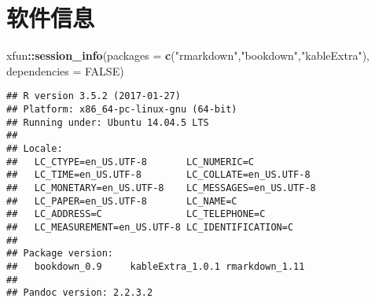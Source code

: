 \documentclass[]{book}
\newenvironment{Shaded}{\begin{snugshade}}{\end{snugshade}}
\newcommand{\DataTypeTok}[1]{\textcolor[rgb]{0.13,0.29,0.53}{#1}}
\newcommand{\KeywordTok}[1]{\textcolor[rgb]{0.13,0.29,0.53}{\textbf{#1}}}
\newcommand{\NormalTok}[1]{#1}
\newcommand{\OperatorTok}[1]{\textcolor[rgb]{0.81,0.36,0.00}{\textbf{#1}}}
\newcommand{\OtherTok}[1]{\textcolor[rgb]{0.56,0.35,0.01}{#1}}
\newcommand{\StringTok}[1]{\textcolor[rgb]{0.31,0.60,0.02}{#1}}
\begin{document}
\section{软件信息}

\begin{Shaded}
\begin{Highlighting}[]
\NormalTok{xfun}\OperatorTok{::}\KeywordTok{session_info}\NormalTok{(}\DataTypeTok{packages =} \KeywordTok{c}\NormalTok{(}\StringTok{"rmarkdown"}\NormalTok{,}\StringTok{"bookdown"}\NormalTok{,}\StringTok{"kableExtra"}\NormalTok{),}
                   \DataTypeTok{dependencies =} \OtherTok{FALSE}\NormalTok{)}
\end{Highlighting}
\end{Shaded}

\begin{verbatim}
## R version 3.5.2 (2017-01-27)
## Platform: x86_64-pc-linux-gnu (64-bit)
## Running under: Ubuntu 14.04.5 LTS
## 
## Locale:
##   LC_CTYPE=en_US.UTF-8       LC_NUMERIC=C              
##   LC_TIME=en_US.UTF-8        LC_COLLATE=en_US.UTF-8    
##   LC_MONETARY=en_US.UTF-8    LC_MESSAGES=en_US.UTF-8   
##   LC_PAPER=en_US.UTF-8       LC_NAME=C                 
##   LC_ADDRESS=C               LC_TELEPHONE=C            
##   LC_MEASUREMENT=en_US.UTF-8 LC_IDENTIFICATION=C       
## 
## Package version:
##   bookdown_0.9     kableExtra_1.0.1 rmarkdown_1.11  
## 
## Pandoc version: 2.2.3.2
\end{verbatim}


\end{document}
